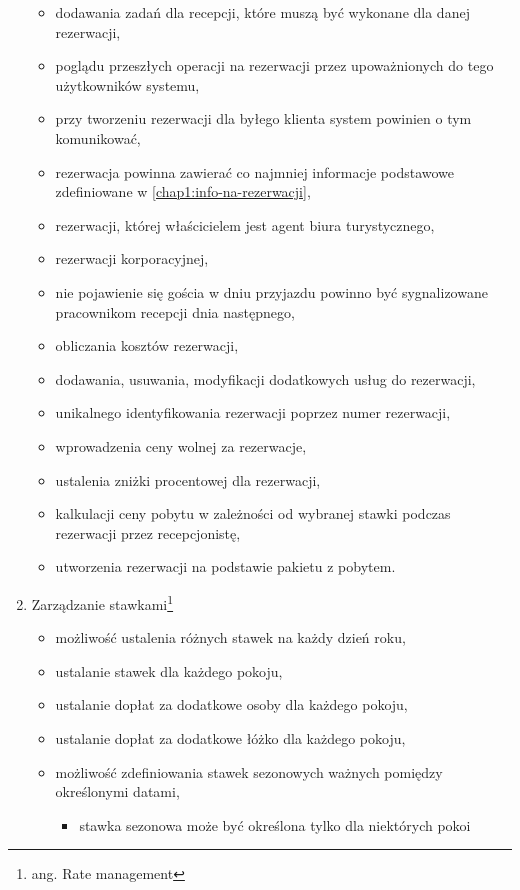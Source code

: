 \documentclass[a4paper,onecolumn,oneside,11pt,wide,floatssmall]{mwrep}
\theoremstyle{definition}
\theoremstyle{plain}%
\theoremstyle{remark}
\begin{document}
\begin{enumerate}
\begin{itemize}
      \item dodawania zadań dla recepcji, które muszą być wykonane dla danej rezerwacji,
      \item poglądu przeszłych operacji na rezerwacji przez upoważnionych do tego użytkowników systemu,
      \item przy tworzeniu rezerwacji dla byłego klienta system powinien o tym komunikować,
      \item rezerwacja powinna zawierać co najmniej informacje podstawowe zdefiniowane w \ref{chap1:info-na-rezerwacji},
      \item rezerwacji, której właścicielem jest agent biura turystycznego,
      \item rezerwacji korporacyjnej,
      \item nie pojawienie się gościa w dniu przyjazdu powinno być sygnalizowane pracownikom recepcji dnia następnego,
      \item obliczania kosztów rezerwacji,
      \item dodawania, usuwania, modyfikacji dodatkowych usług do rezerwacji,
      \item unikalnego identyfikowania rezerwacji poprzez numer rezerwacji,
      \item wprowadzenia ceny wolnej za rezerwacje,
      \item ustalenia zniżki procentowej dla rezerwacji,
      \item kalkulacji ceny pobytu w zależności od wybranej stawki podczas rezerwacji przez recepcjonistę,
      \item utworzenia rezerwacji na podstawie pakietu z pobytem.
    \end{itemize}
  \item Zarządzanie stawkami\footnote{ang. Rate management}
    \begin{itemize}
      \item możliwość ustalenia różnych stawek na każdy dzień roku,
      \item ustalanie stawek dla każdego pokoju,
      \item ustalanie dopłat za dodatkowe osoby dla każdego pokoju,
      \item ustalanie dopłat za dodatkowe łóżko dla każdego pokoju,
      \item możliwość zdefiniowania stawek sezonowych ważnych pomiędzy określonymi datami,
        \begin{itemize}
          \item stawka sezonowa może być określona tylko dla niektórych pokoi

\end{itemize}
\end{itemize}
\end{enumerate}
\end{document}

